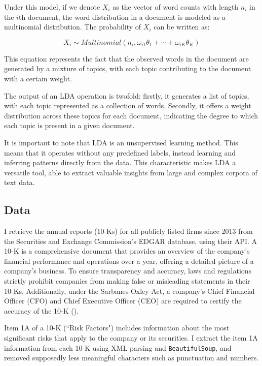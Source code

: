 \documentclass[12pt, letterpaper]{article}
\begin{document}
Under this model, if we denote $X_i$ as the vector of word counts with length $n_i$ in the $i$th document, the word distribution in a document is modeled as a multinomial distribution. The probability of $X_i$ can be written as:

\begin{equation}
X_i \sim Multinomial\left(n_i, \omega_{i 1} \theta_1+\cdots+\omega_{i K} \theta_K\right)
\end{equation}

This equation represents the fact that the observed words in the document are generated by a mixture of topics, with each topic contributing to the document with a certain weight.

The output of an LDA operation is twofold: firstly, it generates a list of topics, with each topic represented as a collection of words. Secondly, it offers a weight distribution across these topics for each document, indicating the degree to which each topic is present in a given document.

It is important to note that LDA is an unsupervised learning method. This means that it operates without any predefined labels, instead learning and inferring patterns directly from the data. This characteristic makes LDA a versatile tool, able to extract valuable insights from large and complex corpora of text data.

\subsection{Data}

I retrieve the annual reports (10-Ks) for all publicly listed firms since 2013 from the Securities and Exchange Commission's EDGAR database, using their API. A 10-K is a comprehensive document that provides an overview of the company's financial performance and operations over a year, offering a detailed picture of a company's business.  To ensure transparency and accuracy, laws and regulations strictly prohibit companies from making false or misleading statements in their 10-Ks. Additionally, under the Sarbanes-Oxley Act, a company's Chief Financial Officer (CFO) and Chief Executive Officer (CEO) are required to certify the accuracy of the 10-K (\cite{SEC_Office_of_Investor_Education_and_Advocacy2011-tw}).

Item 1A of a 10-K (``Risk Factors") includes information about the most significant risks that apply to the company or its securities.  I extract the item 1A information from each 10-K using XML parsing and \texttt{BeautifulSoup}, and removed supposedly less meaningful characters such as punctuation and numbers.
\end{document}
